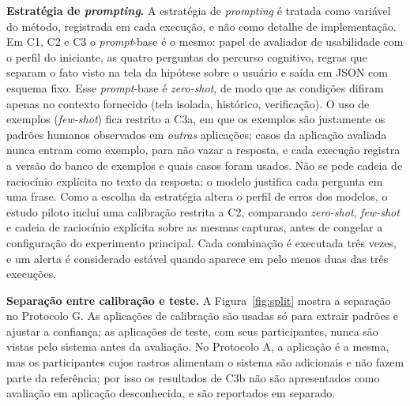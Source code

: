 \documentclass[12pt]{article}
\begin{document}
\textbf{Estratégia de \textit{prompting}.} A estratégia de \textit{prompting} é tratada como variável do método, registrada em cada execução, e não como detalhe de implementação. Em C1, C2 e C3 o \textit{prompt}-base é o mesmo: papel de avaliador de usabilidade com o perfil do iniciante, as quatro perguntas do percurso cognitivo, regras que separam o fato visto na tela da hipótese sobre o usuário e saída em JSON com esquema fixo. Esse \textit{prompt}-base é \textit{zero-shot}, de modo que as condições difiram apenas no contexto fornecido (tela isolada, histórico, verificação). O uso de exemplos (\textit{few-shot}) \cite{brown2020fewshot} fica restrito a C3a, em que os exemplos são justamente os padrões humanos observados em \textit{outras} aplicações; casos da aplicação avaliada nunca entram como exemplo, para não vazar a resposta, e cada execução registra a versão do banco de exemplos e quais casos foram usados. Não se pede cadeia de raciocínio explícita no texto da resposta; o modelo justifica cada pergunta em uma frase. Como a escolha da estratégia altera o perfil de erros dos modelos, o estudo piloto inclui uma calibração restrita a C2, comparando \textit{zero-shot}, \textit{few-shot} e cadeia de raciocínio explícita \cite{wei2022cot} sobre as mesmas capturas, antes de congelar a configuração do experimento principal. Cada combinação é executada três vezes, e um alerta é considerado estável quando aparece em pelo menos duas das três execuções.

\textbf{Separação entre calibração e teste.} A Figura~\ref{fig:split} mostra a separação no Protocolo G. As aplicações de calibração são usadas só para extrair padrões e ajustar a confiança; as aplicações de teste, com seus participantes, nunca são vistas pelo sistema antes da avaliação. No Protocolo A, a aplicação é a mesma, mas os participantes cujos rastros alimentam o sistema são adicionais e não fazem parte da referência; por isso os resultados de C3b não são apresentados como avaliação em aplicação desconhecida, e são reportados em separado.
\end{document}
